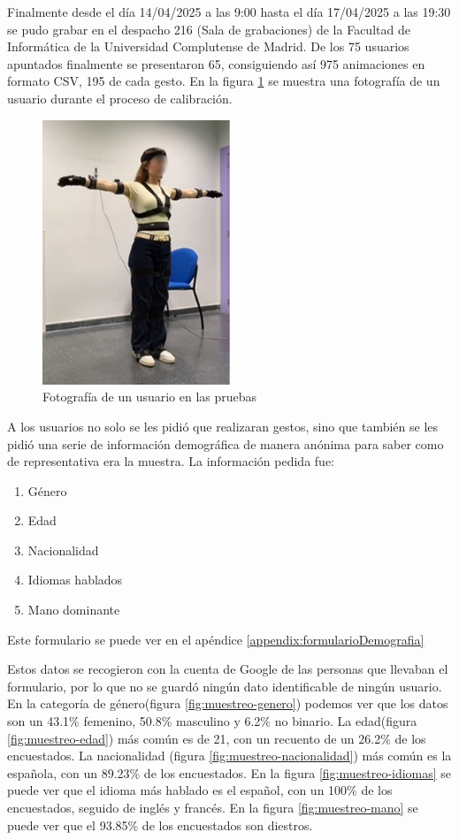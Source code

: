 Finalmente desde el día 14/04/2025 a las 9:00 hasta el día 17/04/2025 a las 19:30 se pudo grabar en el despacho 216 (Sala de grabaciones) de la Facultad de Informática de la Universidad Complutense de Madrid.
De los 75 usuarios apuntados finalmente se presentaron 65, consiguiendo así 975 animaciones en formato CSV, 195 de cada gesto. En la figura \ref{fig:PruebasLidia} se muestra una fotografía de un usuario durante el proceso de calibración.

\begin{figure}[H]
	\centering
	\includegraphics[width=0.5\textwidth]{Imagenes/Vectorial/LidiaPruebasBlurr.pdf}
	\caption{Fotografía de un usuario en las pruebas}
	\label{fig:PruebasLidia}
\end{figure}

A los usuarios no solo se les pidió que realizaran gestos, sino que también se les pidió una serie de información demográfica de manera anónima para saber como de representativa era la muestra. La información pedida fue:

\begin{enumerate}
	\item Género
	\item Edad
	\item Nacionalidad
	\item Idiomas hablados
	\item Mano dominante
\end{enumerate}

Este formulario se puede ver en el apéndice \ref{appendix:formularioDemografia}

Estos datos se recogieron con la cuenta de Google de las personas que llevaban el formulario, por lo que no se guardó ningún dato identificable de ningún usuario. En la categoría de género(figura \ref{fig:muestreo-genero}) podemos ver que los datos son un 43.1\% femenino, 50.8\% masculino y 6.2\% no binario. La edad(figura \ref{fig:muestreo-edad}) más común es de 21, con un recuento de un 26.2\% de los encuestados. La nacionalidad (figura \ref{fig:muestreo-nacionalidad}) más común es la española, con un 89.23\% de los encuestados. En la figura \ref{fig:muestreo-idiomas} se puede ver que el idioma más hablado es el español, con un 100\% de los encuestados, seguido de inglés y francés. En la figura \ref{fig:muestreo-mano} se puede ver que el 93.85\% de los encuestados son diestros.

